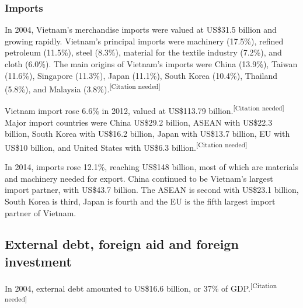 \documentclass{article}
\begin{document}
\subsubsection*{Imports}

In 2004, Vietnam's merchandise imports were valued at US\$31.5 billion and growing rapidly. Vietnam's principal imports were machinery (17.5\%), refined petroleum (11.5\%), steel (8.3\%), material for the textile industry (7.2\%), and cloth (6.0\%). The main origins of Vietnam's imports were China (13.9\%), Taiwan (11.6\%), Singapore (11.3\%), Japan (11.1\%), South Korea (10.4\%), Thailand (5.8\%), and Malaysia (3.8\%).\textsuperscript{[Citation needed]}

Vietnam import rose 6.6\% in 2012, valued at US\$113.79 billion.\textsuperscript{[Citation needed]} Major import countries were China US\$29.2 billion, ASEAN with US\$22.3 billion, South Korea with US\$16.2 billion, Japan with US\$13.7 billion, EU with US\$10 billion, and United States with US\$6.3 billion.\textsuperscript{[Citation needed]}

In 2014, imports rose 12.1\%, reaching US\$148 billion, most of which are materials and machinery needed for export. China continued to be Vietnam's largest import partner, with US\$43.7 billion. The ASEAN is second with US\$23.1 billion, South Korea is third, Japan is fourth and the EU is the fifth largest import partner of Vietnam.

\subsection*{External debt, foreign aid and foreign investment}

In 2004, external debt amounted to US\$16.6 billion, or 37\% of GDP.\textsuperscript{[Citation needed]}
\end{document}
